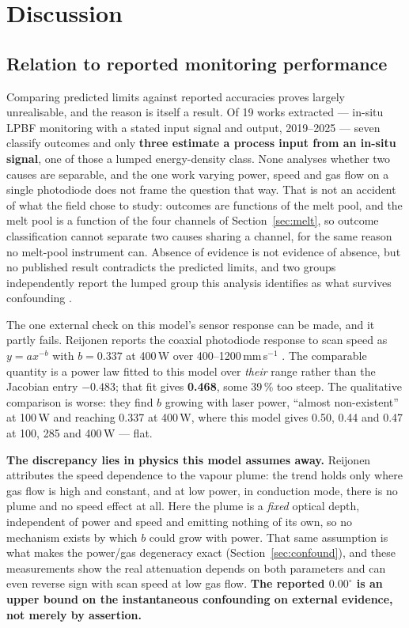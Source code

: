\documentclass[preprint,times]{elsarticle}
\begin{document}
\section{Discussion}

\subsection{Relation to reported monitoring performance}

Comparing predicted limits against reported accuracies proves largely
unrealisable, and the reason is itself a result. Of 19 works extracted --- in-situ
LPBF monitoring with a stated input signal and output, 2019--2025 --- seven
classify outcomes and only \textbf{three estimate a process input from an in-situ
signal}, one of those a lumped energy-density class. None analyses whether two
causes are separable, and the one work varying power, speed and gas flow on a
single photodiode \cite{Reijonen2024} does not frame the question that way. That is not an accident of what the field chose
to study: outcomes are functions of the melt pool, and the melt pool is a
function of the four channels of Section~\ref{sec:melt}, so outcome
classification cannot separate two causes sharing a channel, for the same reason
no melt-pool instrument can. Absence of evidence is not evidence of absence, but
no published result contradicts the predicted limits, and two groups
independently report the lumped group this analysis identifies as what survives
confounding \cite{Blanc2024,kNN2025}.

The one external check on this model's sensor response can be made, and it
partly fails. Reijonen reports the coaxial photodiode response to scan speed as
$y=ax^{-b}$ with $b=0.337$ at 400\,W over 400--1200\,mm\,s$^{-1}$
\cite{Reijonen2024}. The comparable quantity is a power law fitted to this model
over \emph{their} range rather than the Jacobian entry $-0.483$; that fit gives
\textbf{0.468}, some 39\,\% too steep. The qualitative comparison is worse: they
find $b$ growing with laser power, ``almost non-existent'' at 100\,W and
reaching 0.337 at 400\,W, where this model gives 0.50, 0.44 and 0.47 at 100, 285
and 400\,W --- flat.

\textbf{The discrepancy lies in physics this model assumes away.} Reijonen
attributes the speed dependence to the vapour plume: the trend holds only where
gas flow is high and constant, and at low power, in conduction mode, there is no
plume and no speed effect at all. Here the plume is a \emph{fixed} optical depth,
independent of power and speed and emitting nothing of its own, so no mechanism
exists by which $b$ could grow with power. That same assumption is what makes
the power/gas degeneracy exact (Section~\ref{sec:confound}), and these
measurements show the real attenuation depends on both parameters and can even
reverse sign with scan speed at low gas flow. \textbf{The reported $0.00^\circ$
is an upper bound on the instantaneous confounding on external evidence, not
merely by assertion.}
\end{document}
